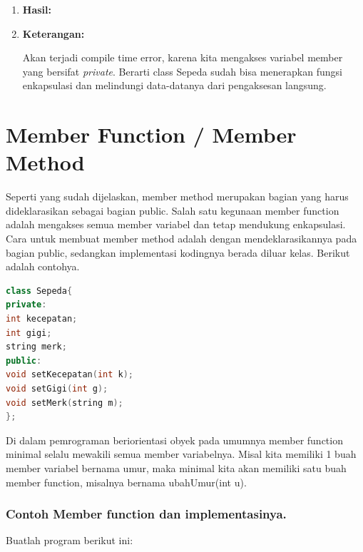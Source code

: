 \begin{enumerate}
\item 	\textbf{Hasil:}
	
	\begin{figure}[htbp]
		\centering
{}

	\end{figure}
	
\item 	\textbf{Keterangan:}
	
	Akan terjadi compile time error, karena kita mengakses variabel member
	yang bersifat \emph{private}. Berarti class Sepeda sudah bisa menerapkan
	fungsi enkapsulasi dan melindungi data-datanya dari pengaksesan
	langsung.
\end{enumerate}




\section{Member Function / Member
Method}\label{member-function-member-method}

Seperti yang sudah dijelaskan, member method merupakan bagian yang harus
dideklarasikan sebagai bagian public. Salah satu kegunaan member
function adalah mengakses semua member variabel dan tetap mendukung
enkapsulasi. Cara untuk membuat member method adalah dengan
mendeklarasikannya pada bagian public, sedangkan implementasi kodingnya
berada diluar kelas. Berikut adalah contohya.

\begin{lstlisting}[language=c++, numbers=none]
class Sepeda{
private:
int kecepatan;
int gigi;
string merk;
public:
void setKecepatan(int k);
void setGigi(int g);
void setMerk(string m);
};
\end{lstlisting}

Di dalam pemrograman beriorientasi obyek pada umumnya member function
minimal selalu mewakili semua member variabelnya. Misal kita memiliki 1
buah member variabel bernama umur, maka minimal kita akan memiliki satu
buah member function, misalnya bernama ubahUmur(int u).

\subsubsection*{Contoh  Member function dan implementasinya.}

Buatlah program berikut ini:

